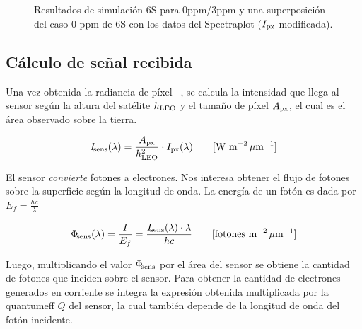 \documentclass[11pt,titlepage]{article}
\begin{document}
\begin{figure}[htb!]
    \centering
    \caption{Resultados de simulación 6S para 0ppm/3ppm y una superposición del caso 0 ppm de 6S con los datos del Spectraplot ($I_{\mathrm{px}}$ modificada).}
    \label{fig:irradianzasComparativo}
\end{figure}

	



\subsection{Cálculo de señal recibida}
Una vez obtenida la radiancia de píxel \pixrad~, se calcula la intensidad que llega al sensor según la altura del satélite $h_{{\mathrm{\tiny LEO}}}$ y el tamaño de píxel $A_{\mathrm{px}}$, el cual es el área observado sobre la tierra. 

\begin{equation}
    I_{{\! \mathrm{\footnotesize sens}}}(\lambda) =  \frac{A_{\mathrm{px}}}{h_{{\mathrm{\tiny LEO}}}^2} \cdot  I_{\mathrm{px}}(\lambda) \qquad [\text{W m}^{-2}\, \mu\text{m}^{-1} ] 
\end{equation}

El sensor \textit{convierte} fotones a electrones. Nos interesa obtener el flujo de fotones sobre la superficie según la longitud de onda. La energía de un fotón es dada por $E_f = \frac{hc}{\lambda}$ 

\begin{equation}
    \Phi_{{\! \mathrm{\footnotesize sens}}}(\lambda) = \frac{I}{E_f} = \frac{I_{{\! \mathrm{\footnotesize sens}}}(\lambda) \cdot \lambda }{hc} \qquad [\text{fotones m}^{-2}\, \mu \text{m}^{-1}] 
\end{equation}

Luego, multiplicando el valor $\Phi_{{\! \mathrm{\footnotesize sens}}}$ por el área del sensor se obtiene la cantidad de fotones que inciden sobre el sensor. Para obtener la cantidad de electrones generados en corriente se integra la expresión obtenida multiplicada por la \gls{quantumeff} $Q$ del sensor, la cual también depende de la longitud de onda del fotón incidente.
\end{document}
